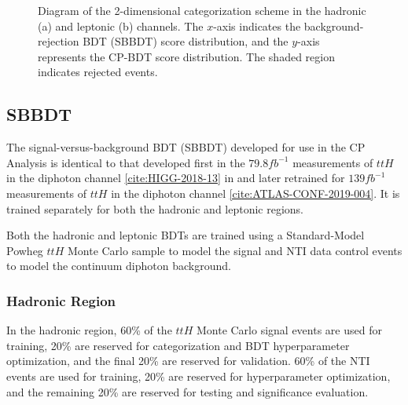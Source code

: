 \begin{figure}[htbp]
  \centering
  \caption{Diagram of the 2-dimensional categorization scheme in the hadronic (a) and leptonic (b) channels. The $x$-axis indicates the background-rejection BDT (SBBDT) score distribution, and the $y$-axis represents the CP-BDT score distribution. The shaded region indicates rejected events.}
  \label{fig:cartoon}
\end{figure}

\subsection{SBBDT}

The signal-versus-background BDT (SBBDT) developed for use in the CP Analysis is identical to that developed first in the $79.8 fb^{-1}$ measurements of $ttH$ in the diphoton channel \ref{cite:HIGG-2018-13} in and later retrained for $139 fb^{-1}$ measurements of $ttH$ in the diphoton channel \ref{cite:ATLAS-CONF-2019-004}. It is trained separately for both the hadronic and leptonic regions.

Both the hadronic and leptonic BDTs are trained using a Standard-Model Powheg $ttH$ Monte Carlo sample to model the signal and NTI data control events to model the continuum diphoton background.

\subsubsection{Hadronic Region} \label{sec:SBBDThad} 
In the hadronic region, 60\% of the $ttH$ Monte Carlo signal events are used for training, 20\% are reserved for categorization and BDT hyperparameter optimization, and the final 20\% are reserved for validation. 60\% of the NTI events are used for training, 20\% are reserved for hyperparameter optimization, and the remaining 20\% are reserved for testing and significance evaluation.

